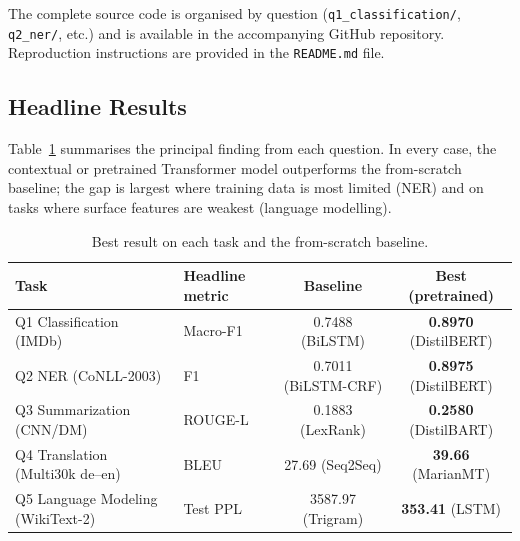 \documentclass[11pt,a4paper]{article}
\begin{document}
The complete source code is organised by question
(\texttt{q1\_classification/}, \texttt{q2\_ner/}, etc.) and is
available in the accompanying GitHub repository. Reproduction
instructions are provided in the \texttt{README.md} file.

\subsection{Headline Results}

Table~\ref{tab:headline} summarises the principal finding from each
question. In every case, the contextual or pretrained Transformer
model outperforms the from-scratch baseline; the gap is largest where
training data is most limited (NER) and on tasks where surface
features are weakest (language modelling).

\begin{table}[h]
\centering
\caption{Best result on each task and the from-scratch baseline.}
\label{tab:headline}
\small
\begin{tabular}{llcc}
\toprule
Task & Headline metric & Baseline & Best (pretrained) \\
\midrule
Q1 Classification (IMDb)        & Macro-F1   & 0.7488 (BiLSTM)       & \textbf{0.8970} (DistilBERT) \\
Q2 NER (CoNLL-2003)             & F1         & 0.7011 (BiLSTM-CRF)   & \textbf{0.8975} (DistilBERT) \\
Q3 Summarization (CNN/DM)       & ROUGE-L    & 0.1883 (LexRank)      & \textbf{0.2580} (DistilBART) \\
Q4 Translation (Multi30k de–en) & BLEU       & 27.69 (Seq2Seq)       & \textbf{39.66} (MarianMT)    \\
Q5 Language Modeling (WikiText-2) & Test PPL & 3587.97 (Trigram)     & \textbf{353.41} (LSTM)       \\
\bottomrule
\end{tabular}
\end{table}


\newpage

\newpage

\newpage

\newpage


\newpage
\end{document}
